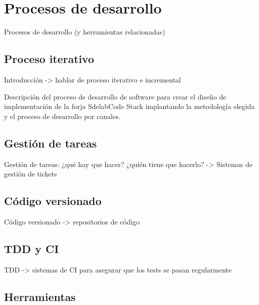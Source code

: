 \chapter{Procesos de desarrollo}
\label{chap:procesos-desarrollo}

\par Procesos de desarrollo (y herramientas relacionadas)

\section{Proceso iterativo}
\label{sec:proc-iterativo}

\par Introducción -> hablar de proceso iterativo e incremental

\par Descripci\'on del proceso de desarrollo de software para crear el dise\~no de implementaci\'on de la forja SdelabCode Stack implantando la metodolog\'ia elegida y el proceso de desarrollo por canales.


\section{Gestión de tareas}
\label{sec:gestion-tareas}

\par Gestión de tareas: ¿qué hay que hacer? ¿quién tiene que hacerlo? -> Sistemas de gestión de tickets

\section{Código versionado}
\label{sec:codigo-versionado}

\par Código versionado -> repositorios de código


\section{TDD y CI}
\label{sec:tdd-ci}

\par TDD -> sistemas de CI para asegurar que los tests se pasan regularmente


\section{Herramientas}
\label{sec:herramientas}

